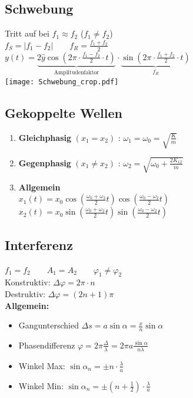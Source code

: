 \documentclass[german]{latex4ei/latex4ei_sheet}
\begin{document}
\subsection{Schwebung}
Tritt auf bei $f_1\approx f_2$ ($f_1 \neq f_2$)\\
$f_S=|f_1-f_2| \qquad f_R= \frac{f_1+f_2}{2}$\\
$y(t)=\underbrace{2\hat{y}\cos(2\pi \cdot \frac{f_1-f_2}{2}\cdot t)}_{\text{Amplitudenfaktor}} \cdot \underbrace{\sin(2\pi \cdot \frac{f_1+f_2}{2}\cdot t)}_{f_R} $\\ 
\texttt{[image: Schwebung\_crop.pdf]}
\begin{minipage}{\columnwidth}
\subsection{Gekoppelte Wellen}
\begin{enumerate}
    \item \textbf{Gleichphasig} $(x_1 = x_2)$ : $\omega_1 = \omega_0 = \sqrt{\frac{K}{m}}$
    
    \item \textbf{Gegenphasig} $(x_1 \neq x_2)$ : $\omega_2 = \sqrt{\omega_0 + \frac{2K_{12}}{m}}$
    
    \item \textbf{Allgemein}\\
    $x_1(t) = x_0 \cos\left( \frac{\omega_0 + \omega_2}{2} t \right) \cos\left( \frac{\omega_0 - \omega_2}{2} t \right)$\\
	$x_2(t) = x_0 \sin\left( \frac{\omega_0 + \omega_2}{2} t \right) \sin\left( \frac{\omega_0 - \omega_2}{2} t \right)$
\end{enumerate}
\end{minipage}
\subsection{Interferenz}
$f_1=f_2 \qquad A_1 = A_2 \qquad \varphi_1 \neq \varphi_2$\\
Konstruktiv: $\Delta \varphi = 2\pi \cdot n$\\
Destruktiv: $\Delta \varphi = (2n+1)\pi$\\
\textbf{Allgemein:}
\begin{itemize}
	\item Gangunterschied $\Delta s = a\sin \alpha = \frac{x}{n}\sin \alpha$
	\item Phasendifferenz $\varphi = 2\pi \frac{\Delta}{\lambda}=2\pi a \frac{\sin \alpha}{n\lambda}$
	\item Winkel Max: $\sin \alpha_n = \pm n \cdot \frac{\lambda}{a}$
	\item Winkel Min: $\sin \alpha_n = \pm (n+\frac{1}{2})\cdot \frac{\lambda}{a}$
\end{itemize}
\end{document}
